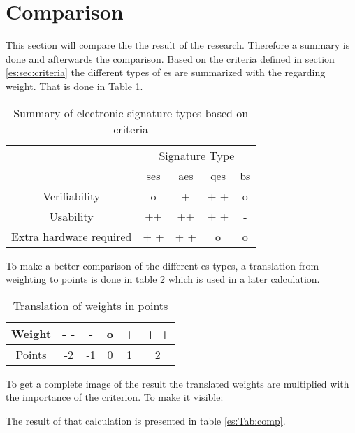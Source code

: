 \section{Comparison}
This section will compare the the result of the research. Therefore a summary is done and afterwards the comparison.
Based on the criteria defined in section \ref{es:sec:criteria} the different types of \gls{es} are summarized with the regarding weight. That is done in Table \ref{es:Tab:summary}.

\begin{table}[h]
	\begin{tabular}{|c|c|c|c|c|} \hline
		\rowcolor{Gray}\multirow{2}{*}{Criterion} & \multicolumn{4}{|c|}{Signature Type} \\
								   & \gls{ses} & \gls{aes} & \gls{qes} & \gls{bs} \\ \cline{1-5}
		Verifiability & o & + & + + & o \\ \hline
		Usability & ++ & ++ & + + & - \\ \hline
		Extra hardware required & + + & + + & o & o \\ \hline
	\end{tabular}
	\centering
	\caption{Summary of electronic signature types based on criteria}
	\label{es:Tab:summary}
\end{table}

To make a better comparison of the different \gls{es} types, a translation from weighting to points is done in table \ref{es:Tab:Translation} which is used in a later calculation.

\begin{table}[h]
	\begin{tabular}{|c|c|c|c|c|c|} \hline
		Weight & - - & - & o & + & + + \\ \hline
		Points & -2 & -1 & 0 & 1 & 2 \\ \hline
	\end{tabular}
	\centering
	\caption{Translation of weights in points}
	\label{es:Tab:Translation}
\end{table}

To get a complete image of the result the translated weights are multiplied with the importance of the criterion. To make it visible: 

\begin{center}
\end{center}
The result of that calculation is presented in table \ref{es:Tab:comp}.

